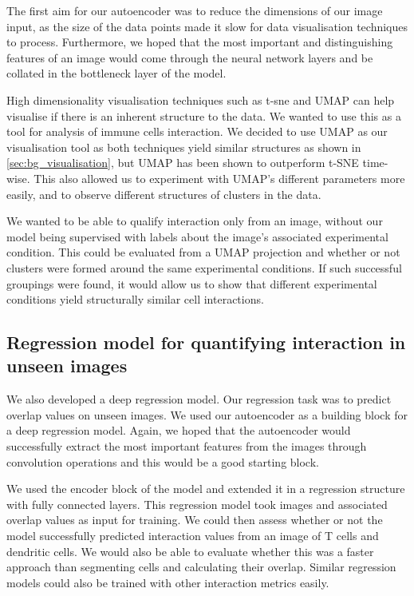 The first aim for our autoencoder was to reduce the dimensions of our image input, as the size of the data points made it slow for data visualisation techniques to process. Furthermore, we hoped that the most important and distinguishing features of an image would come through the neural network layers and be collated in the bottleneck layer of the model. 

High dimensionality visualisation techniques such as t-sne and UMAP can help visualise if there is an inherent structure to the data. We wanted to use this as a tool for analysis of immune cells interaction. We decided to use UMAP as our visualisation tool as both techniques yield similar structures as shown in \autoref{sec:bg_visualisation}, but UMAP has been shown to outperform t-SNE time-wise. This also allowed us to experiment with UMAP's different parameters more easily, and to observe different structures of clusters in the data.

We wanted to be able to qualify interaction only from an image, without our model being supervised with labels about the image's associated experimental condition. This could be evaluated from a UMAP projection and whether or not clusters were formed around the same experimental conditions. If such successful groupings were found, it would allow us to show that different experimental conditions yield structurally similar cell interactions. 

\subsection{Regression model for quantifying interaction in unseen images}

We also developed a deep regression model. Our regression task was to predict overlap values on unseen images. We used our autoencoder as a building block for a deep regression model. Again, we hoped that the autoencoder would successfully extract the most important features from the images through convolution operations and this would be a good starting block.

We used the encoder block of the model and extended it in a regression structure with fully connected layers. This regression model took images and associated overlap values as input for training. We could then assess whether or not the model successfully predicted interaction values from an image of T cells and dendritic cells. We would also be able to evaluate whether this was a faster approach than segmenting cells and calculating their overlap. Similar regression models could also be trained with other interaction metrics easily.
